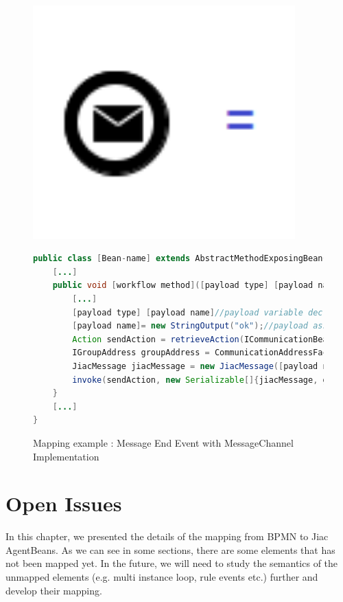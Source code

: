 \begin{figure}[hbtp]
\begin{minipage}[c]{0.28\textwidth}
\includegraphics[width=0.9\textwidth]{images/mapping/message_end.png}
\end{minipage}
\begin{minipage}[c]{0.72\textwidth}
\begin{lstlisting}[language = Java]
public class [Bean-name] extends AbstractMethodExposingBean{
	[...]
	public void [workflow method]([payload type] [payload name]){
		[...]
		[payload type] [payload name]//payload variable declaration
		[payload name]= new StringOutput("ok");//payload assignment
		Action sendAction = retrieveAction(ICommunicationBean.ACTION_SEND);
		IGroupAddress groupAddress = CommunicationAddressFactory.createGroupAddress([channel]);
		JiacMessage jiacMessage = new JiacMessage([payload name]);
		invoke(sendAction, new Serializable[]{jiacMessage, groupAddress});
	}
	[...]
}
\end{lstlisting}
\end{minipage}
\caption{Mapping example : Message End Event with MessageChannel Implementation}%
\label{fig:channel_end}
\end{figure}

\section{Open Issues}

In this chapter, we presented the details of the mapping from BPMN to Jiac AgentBeans. As we can see in some sections, there are some elements that has not been mapped yet. In the future, we will need to study the semantics of the unmapped elements (e.g. multi instance loop, rule events etc.) further and develop their mapping.